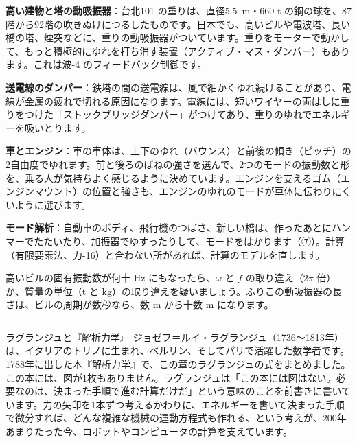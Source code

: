 \begin{phkougaku}
\textbf{高い建物と塔の動吸振器}：台北101 の重りは、直径\qty{5.5}{m}・660 t の鋼の球を、87階から92階の吹きぬけにつるしたものです。日本でも、高いビルや電波塔、長い橋の塔、煙突などに、重りの動吸振器がついています。重りをモーターで動かして、もっと積極的にゆれを打ち消す装置（アクティブ・マス・ダンパー）もあります。これは波-4 のフィードバック制御です。

\textbf{送電線のダンパー}：鉄塔の間の送電線は、風で細かくゆれ続けることがあり、電線が金属の疲れで切れる原因になります。電線には、短いワイヤーの両はしに重りをつけた「ストックブリッジダンパー」がつけてあり、重りのゆれでエネルギーを吸いとります。

\textbf{車とエンジン}：車の車体は、上下のゆれ（バウンス）と前後の傾き（ピッチ）の2自由度でゆれます。前と後ろのばねの強さを選んで、2つのモードの振動数と形を、乗る人が気持ちよく感じるように決めています。エンジンを支えるゴム（エンジンマウント）の位置と強さも、エンジンのゆれのモードが車体に伝わりにくいように選びます。

\textbf{モード解析}：自動車のボディ、飛行機のつばさ、新しい橋は、作ったあとにハンマーでたたいたり、加振器でゆすったりして、モードをはかります（⑦）。計算（有限要素法、力-16）と合わない所があれば、計算のモデルを直します。

\begin{phketa}[多自由度の振動の数の目安]
高いビルの固有振動数が何十 Hz にもなったら、$\omega$ と $f$ の取り違え（$2\pi$ 倍）か、質量の単位（t と kg）の取り違えを疑いましょう。ふりこの動吸振器の長さは、ビルの周期が数秒なら、数 m から十数 m になります。
\end{phketa}
\end{phkougaku}

\begin{column}{ラグランジュと『解析力学』}
ジョゼフ＝ルイ・ラグランジュ（1736〜1813年）は、イタリアのトリノに生まれ、ベルリン、そしてパリで活躍した数学者です。1788年に出した本『解析力学』で、この章のラグランジュの式をまとめました。この本には、図が1枚もありません。ラグランジュは「この本には図はない。必要なのは、決まった手順で進む計算だけだ」という意味のことを前書きに書いています。力の矢印を1本ずつ考えるかわりに、エネルギーを書いて決まった手順で微分すれば、どんな複雑な機械の運動方程式も作れる、という考えが、200年あまりたった今、ロボットやコンピュータの計算を支えています。
\end{column}

